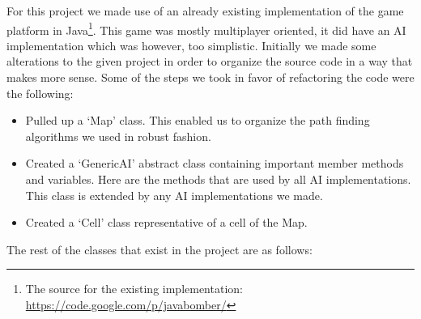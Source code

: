 For this project we made use of an already existing implementation of the game platform in Java\footnote{The source for the existing implementation: \url{https://code.google.com/p/javabomber/}}. This game was mostly multiplayer oriented, it did have an AI implementation which was however, too simplistic.
Initially we made some alterations to the given project in order to organize the source code in a way that makes more sense. Some of the steps we took in favor of refactoring the code were the following:
\begin{itemize}
\item Pulled up a ‘Map’ class. This enabled us to organize the path finding algorithms we used in robust fashion.
\item Created a ‘GenericAI’ abstract class containing important member methods and variables. Here are the methods that are used by all AI implementations. This class is extended by any AI implementations we made.
\item Created a ‘Cell’ class  representative of a cell of the Map.
\end{itemize}

The rest of the classes that exist in the project are as follows:

